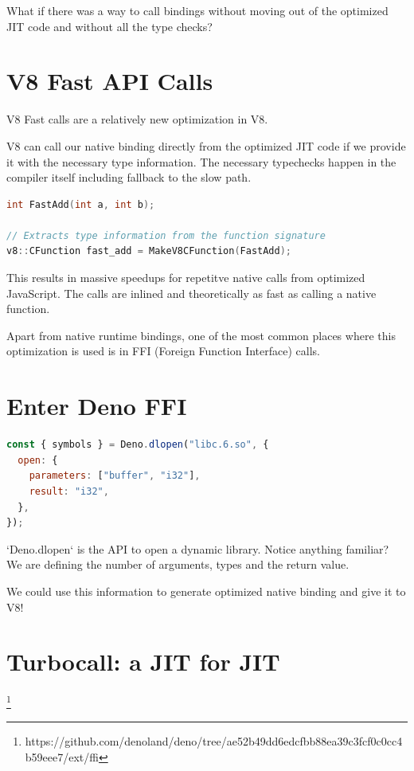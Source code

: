 \documentclass{article}
\begin{document}
What if there was a way to call bindings without moving out of the optimized JIT code and without all the type checks?

\section{V8 Fast API Calls}

V8 Fast calls are a relatively new optimization in V8.

V8 can call our native binding directly from the optimized JIT code if 
we provide it with the necessary type information. The necessary typechecks happen in the compiler itself including fallback to the slow path.

\begin{lstlisting}[language=C++, caption=example V8 Fast API call]
int FastAdd(int a, int b);

// Extracts type information from the function signature
v8::CFunction fast_add = MakeV8CFunction(FastAdd);
\end{lstlisting}

This results in massive speedups for repetitve native calls from optimized JavaScript.
The calls are inlined and theoretically as fast as calling a native function.

Apart from native runtime bindings, one of the most common places where this optimization is used is in FFI (Foreign Function Interface) calls.

\section{Enter Deno FFI}

\begin{lstlisting}[language=JavaScript, caption=example Deno FFI]
const { symbols } = Deno.dlopen("libc.6.so", {
  open: {
    parameters: ["buffer", "i32"],
    result: "i32",
  },
});
\end{lstlisting}

`Deno.dlopen` is the API to open a dynamic library. Notice anything familiar? We are defining the number of arguments, types and the return value.

We could use this information to generate optimized native binding and give it to V8!

\section{Turbocall: a JIT for JIT}\footnote{https://github.com/denoland/deno/tree/ae52b49dd6edcfbb88ea39c3fcf0c0cc4b59eee7/ext/ffi}
\end{document}
